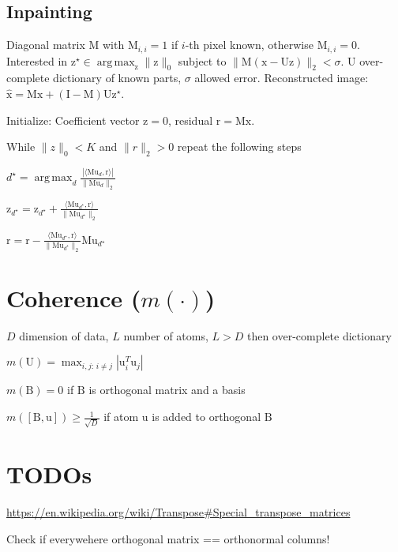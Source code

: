 \documentclass[a4paper, 11pt, landscape]{article}
\newcommand{\matr}[1]{\boldsymbol{\mathrm{#1}}}
\DeclareMathOperator*{\argmax}{arg\,max}
\begin{document}
\begin{multicols*}{3}
\subsection{Inpainting}
Diagonal matrix $\matr{M}$ with $\matr{M}_{i, i} = 1$ if $i$-th pixel known, otherwise $\matr{M}_{i,i} = 0$. Interested in $\matr{z}^\star \in \argmax_{\matr{z}} \|\matr{z}\|_0$ subject to $\|\matr{M}(\matr{x} - \matr{Uz})\|_2 < \sigma$. $\matr{U}$ over-complete dictionary of known parts, $\sigma$ allowed error. Reconstructed image: $\hat{\matr{x}} = \matr{Mx} + (\matr{I} - \matr{M})\matr{U} \matr{z}^\star$.
\begin{compactenum}
	\item Initialize: Coefficient vector $\matr{z} = \matr{0}$, residual $\matr{r} = \matr{M}\matr{x}$.
	\item While $\|z\|_0 < K$ and $\|r\|_2 > 0$ repeat the following steps
	\begin{listcols}[2][5pt]
		\item $d^\star = \argmax_d \frac{|\langle \matr{M}\matr{u}_d, \matr{r}\rangle|}{\|\matr{M}\matr{u}_d\|_2}$
		\item $\matr{z}_{d^\star} = \matr{z}_{d^\star} + \frac{\langle \matr{M}\matr{u}_{d^\star}, \matr{r} \rangle}{\|\matr{M}\matr{u}_{d^\star}\|_2}$
		\item $\matr{r} = \matr{r} - \frac{\langle \matr{M}\matr{u}_{d^\star}, \matr{r} \rangle}{\|\matr{M}\matr{u}_{d^\star}\|_2} \matr{M}\matr{u}_{d^\star}$
	\end{listcols}
\end{compactenum}


\section{Coherence ($m(\cdot)$)}
\begin{compactitem}
	\item $D$ dimension of data, $L$ number of atoms, $L > D$ then over-complete dictionary
	\item $m(\matr{U}) = \max_{i,j:\, i \neq j} | \matr{u}_i^T \matr{u}_j |$
	\item $m(\matr{B}) = 0$ if $\matr{B}$ is orthogonal matrix and a basis
	\item $m([\matr{B}, \matr{u}]) \geq \frac{1}{\sqrt{D}}$ if atom $\matr{u}$ is added to orthogonal $\matr{B}$
\end{compactitem}


\section{TODOs}
\url{https://en.wikipedia.org/wiki/Transpose#Special_transpose_matrices}

Check if everywehere orthogonal matrix == orthonormal columns!



\raggedcolumns
\end{multicols*}
\end{document}
